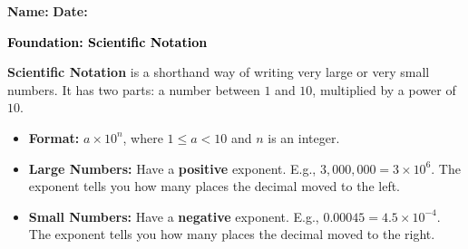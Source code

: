 \documentclass[12pt, letterpaper, fleqn]{article}
\begin{document}
\textbf{Name:} \underline{\hspace{5cm}}
\hfill
\textbf{Date:} \underline{\hspace{3cm}}\\

\begin{tcolorbox}[colback=customteal!20]
    \large\textcolor{black}{\textbf{Foundation: Scientific Notation}}
\end{tcolorbox}

\vspace{3mm}

\noindent
\textbf{Scientific Notation} is a shorthand way of writing very large or very small numbers. It has two parts: a number between $1$ and $10$, multiplied by a power of $10$.

\begin{itemize}
    \item \textbf{Format:} $a \times 10^n$, where $1 \le a < 10$ and $n$ is an integer.
    \item \textbf{Large Numbers:} Have a \textbf{positive} exponent. E.g., $3,000,000 = 3 \times 10^6$. The exponent tells you how many places the decimal moved to the left.
    \item \textbf{Small Numbers:} Have a \textbf{negative} exponent. E.g., $0.00045 = 4.5 \times 10^{-4}$. The exponent tells you how many places the decimal moved to the right.
\end{itemize}

\vspace{4mm}
\end{document}
